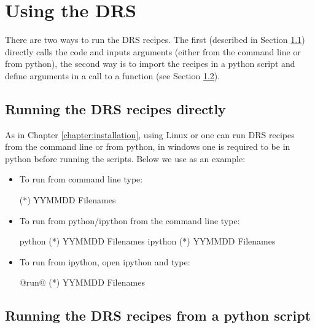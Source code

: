 \chapter{Using the DRS}
\label{chapter:using_the_drs}

There are two ways to run the DRS recipes. The first (described in Section \ref{chapter:using_the_drs:direct}) directly calls the code and inputs arguments (either from the command line or from python), the second way is to import the recipes in a python script and define arguments in a call to a function (see Section \ref{chapter:using_the_drs:script}).

\section{Running the DRS recipes directly}
\label{chapter:using_the_drs:direct}

As in Chapter \ref{chapter:installation}, using Linux or \mac one can run DRS recipes from the command line or from python, in windows one is required to be in python before running the scripts. Below we use \calDARK as an example:
\begin{itemize}
\item To run from command line type:
\begin{cmdbox}
(*\calDARK*) YYMMDD Filenames
\end{cmdbox}

\item To run from python/ipython from the command line type:
\begin{cmdbox}
python (*\calDARK*) YYMMDD Filenames
ipython (*\calDARK*) YYMMDD Filenames
\end{cmdbox}

\item To run from ipython, open ipython and type:
\begin{pythonbox}
@run@ (*\calDARK*) YYMMDD Filenames
\end{pythonbox}
\end{itemize}

\section{Running the DRS recipes from a python script}
\label{chapter:using_the_drs:script}


